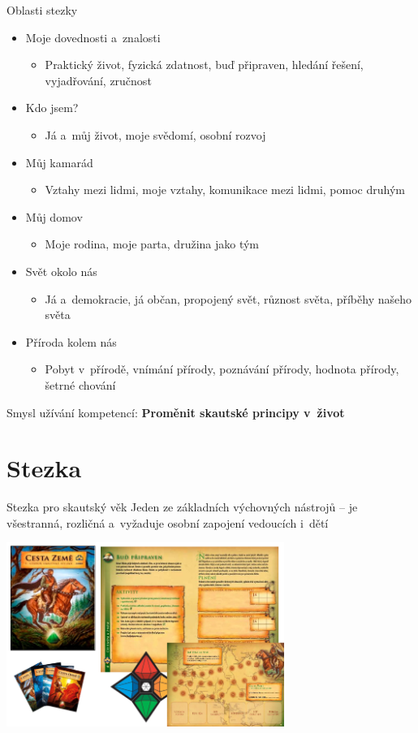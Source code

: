 \documentclass[compress,xelatex,xcolor=dvipsnames,print]{beamer}
\begin{document}
\begin{frame}{Oblasti stezky}
\begin{itemize}
\item Moje dovednosti a~znalosti
 \begin{itemize}
 \item Praktický život, fyzická zdatnost, buď připraven, hledání řešení, vyjadřování, zručnost
 \end{itemize}
\item Kdo jsem?
 \begin{itemize}
 \item Já a~můj život, moje svědomí, osobní rozvoj
 \end{itemize}
\item Můj kamarád
 \begin{itemize}
 \item Vztahy mezi lidmi, moje vztahy, komunikace mezi lidmi, pomoc druhým
 \end{itemize}
\item Můj domov
 \begin{itemize}
 \item Moje rodina, moje parta, družina jako tým
 \end{itemize}
\item Svět okolo nás
 \begin{itemize}
 \item Já a~demokracie, já občan, propojený svět, různost světa, příběhy našeho světa
 \end{itemize}
\item Příroda kolem nás
 \begin{itemize}
 \item Pobyt v~přírodě, vnímání přírody, poznávání přírody, hodnota přírody, šetrné chování
 \end{itemize}
\end{itemize}
Smysl užívání kompetencí: \textbf{Proměnit skautské principy v~život}
\end{frame}

\section{Stezka}

\begin{frame}{Stezka pro skautský věk}
Jeden ze základních výchovných nástrojů -- je všestranná, rozličná a~vyžaduje osobní zapojení vedoucích i~dětí
\begin{center}
\includegraphics[height=6cm]{stezka.png}
\end{center}
\end{frame}
\end{document}
